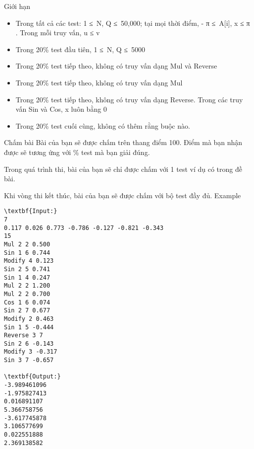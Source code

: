 Giới hạn  
\begin{itemize}
	\item     Trong tất cả các test: 1 ≤ N, Q ≤ 50,000; tại mọi thời điểm, -         π        ≤ A[i], x ≤         π        . Trong mỗi truy vấn, u ≤ v   
	\item     Trong 20\% test đầu tiên, 1 ≤ N, Q ≤ 5000   
	\item     Trong 20\% test tiếp theo, không có truy vấn dạng Mul và Reverse   
	\item     Trong 20\% test tiếp theo, không có truy vấn dạng Mul   
	\item     Trong 20\% test tiếp theo, không có truy vấn dạng Reverse. Trong các truy vấn Sin và Cos, x luôn bằng 0   
	\item     Trong 20\% test cuối cùng, không có thêm rằng buộc nào.   
\end{itemize}
   Chấm bài  
Bài của bạn sẽ được chấm trên thang điểm 100. Điểm mà bạn nhận được sẽ tương ứng với \% test mà bạn giải đúng.  

   Trong quá trình thi, bài của bạn sẽ chỉ được chấm với 1 test ví dụ có trong đề bài.  

   Khi vòng thi kết thúc, bài của bạn sẽ được chấm với bộ test đầy đủ.
    Example   
\begin{verbatim}
\textbf{Input:}
7
0.117 0.026 0.773 -0.786 -0.127 -0.821 -0.343
15
Mul 2 2 0.500
Sin 1 6 0.744
Modify 4 0.123
Sin 2 5 0.741
Sin 1 4 0.247
Mul 2 2 1.200
Mul 2 2 0.700
Cos 1 6 0.074
Sin 2 7 0.677
Modify 2 0.463
Sin 1 5 -0.444
Reverse 3 7
Sin 2 6 -0.143
Modify 3 -0.317
Sin 3 7 -0.657

\textbf{Output:}
-3.989461096
-1.975827413
0.016891107
5.366758756
-3.617745878
3.106577699
0.022551888
2.369138582
\end{verbatim}